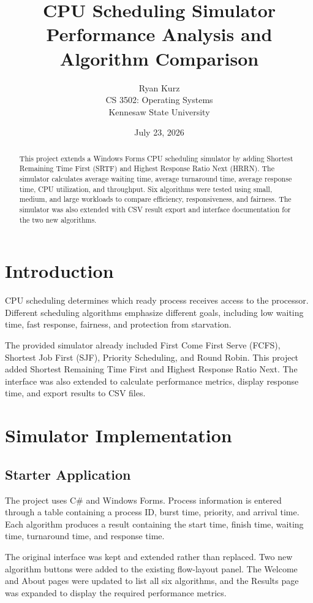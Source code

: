 \documentclass[12pt]{article}
\title{CPU Scheduling Simulator\\
Performance Analysis and Algorithm Comparison}
\author{Ryan Kurz\\
CS 3502: Operating Systems\\
Kennesaw State University}
\date{July 23, 2026}
\begin{document}
\maketitle

\begin{abstract}
This project extends a Windows Forms CPU scheduling simulator by adding
Shortest Remaining Time First (SRTF) and Highest Response Ratio Next (HRRN).
The simulator calculates average waiting time, average turnaround time,
average response time, CPU utilization, and throughput. Six algorithms were
tested using small, medium, and large workloads to compare efficiency,
responsiveness, and fairness. The simulator was also extended with CSV
result export and interface documentation for the two new algorithms.
\end{abstract}

\tableofcontents
\newpage

\section{Introduction}

CPU scheduling determines which ready process receives access to the processor.
Different scheduling algorithms emphasize different goals, including low
waiting time, fast response, fairness, and protection from starvation.

The provided simulator already included First Come First Serve (FCFS),
Shortest Job First (SJF), Priority Scheduling, and Round Robin. This project
added Shortest Remaining Time First and Highest Response Ratio Next. The
interface was also extended to calculate performance metrics, display response
time, and export results to CSV files.

\section{Simulator Implementation}

\subsection{Starter Application}

The project uses C\# and Windows Forms. Process information is entered through
a table containing a process ID, burst time, priority, and arrival time. Each
algorithm produces a result containing the start time, finish time, waiting
time, turnaround time, and response time.

The original interface was kept and extended rather than replaced. Two new
algorithm buttons were added to the existing flow-layout panel. The Welcome
and About pages were updated to list all six algorithms, and the Results page
was expanded to display the required performance metrics.
\end{document}
